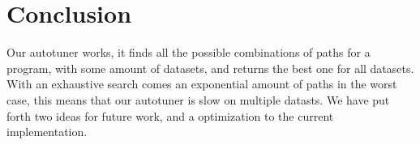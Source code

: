 \section{Conclusion}
Our autotuner works, it finds all the possible combinations of paths for a program, with some amount of datasets, and returns the best one for all datasets. With an exhaustive search comes an exponential amount of paths in the worst case, this means that our autotuner is slow on multiple datasts. We have put forth two ideas for future work, and a optimization to the current implementation.